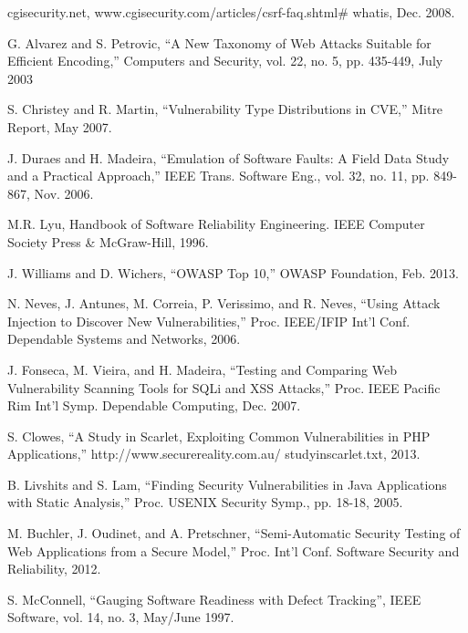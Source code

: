 \documentclass[12pt,a4paper]{report}
\begin{document}
\begin{thebibliography}{8}

cgisecurity.net, www.cgisecurity.com/articles/csrf-faq.shtml\#
whatis, Dec. 2008.

G. Alvarez and S. Petrovic,  ``A New Taxonomy of Web Attacks Suitable for Efficient Encoding,'' Computers and Security, vol. 22,
no. 5, pp. 435-449, July 2003



S. Christey and R. Martin,  ``Vulnerability Type Distributions in
CVE,'' Mitre Report, May 2007.

J. Duraes and H. Madeira,  ``Emulation of Software Faults: A Field
Data Study and a Practical Approach,'' IEEE Trans. Software Eng.,
vol. 32, no. 11, pp. 849-867, Nov. 2006.

M.R. Lyu, Handbook of Software Reliability Engineering. IEEE
Computer Society Press \& McGraw-Hill, 1996.

J. Williams and D. Wichers,  ``OWASP Top 10,'' OWASP Foundation, Feb. 2013.

N. Neves, J. Antunes, M. Correia, P. Verissimo, and R. Neves,
 ``Using Attack Injection to Discover New Vulnerabilities,'' Proc.
IEEE/IFIP Int’l Conf. Dependable Systems and Networks, 2006.

J. Fonseca, M. Vieira, and H. Madeira,  ``Testing and Comparing
Web Vulnerability Scanning Tools for SQLi and XSS Attacks,''
Proc. IEEE Pacific Rim Int’l Symp. Dependable Computing, Dec. 2007.

S. Clowes,  ``A Study in Scarlet, Exploiting Common Vulnerabilities in PHP Applications,'' http://www.securereality.com.au/
studyinscarlet.txt, 2013.

B. Livshits and S. Lam,  ``Finding Security Vulnerabilities in Java
Applications with Static Analysis,'' Proc. USENIX Security Symp.,
pp. 18-18, 2005.

M. Buchler, J. Oudinet, and A. Pretschner,  ``Semi-Automatic Security Testing of Web Applications from a Secure Model,'' Proc. Int’l
Conf. Software Security and Reliability, 2012.

S. McConnell, ``Gauging Software Readiness with Defect
Tracking'', IEEE Software, vol. 14, no. 3, May/June 1997.


\end{thebibliography}
\end{document}
